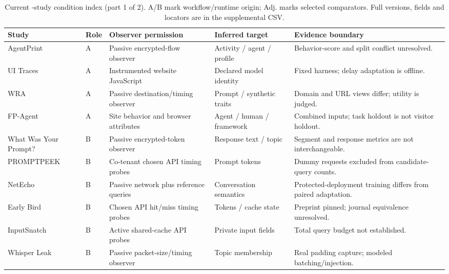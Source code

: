 \begin{table}[!t]
\centering\footnotesize
\setlength{\tabcolsep}{3pt}\renewcommand{\arraystretch}{1.08}
\caption{Current \FinalN{}-study condition index (part 1 of 2). A/B mark workflow/runtime origin; Adj. marks selected comparators. Full versions, fields and locators are in the supplemental CSV.}
\label{app:final-study-matrix}\label{tab:final-study-matrix-1}
\begin{tabularx}{\textwidth}{@{}>{\raggedright\arraybackslash}p{}>{\raggedright\arraybackslash}p{}>{\raggedright\arraybackslash}p{}>{\raggedright\arraybackslash}p{}Y@{}}
\toprule Study & Role & Observer permission & Inferred target & Evidence boundary \\
\midrule
AgentPrint \cite{agentprint2025} & A & Passive encrypted-flow observer & Activity / agent / profile & Behavior-score and split conflict unresolved. \\
UI Traces \cite{uitraces2026} & A & Instrumented website JavaScript & Declared model identity & Fixed harness; delay adaptation is offline. \\
WRA \cite{jeong2026wra} & A & Passive destination/timing observer & Prompt / synthetic traits & Domain and URL views differ; utility is judged. \\
FP-Agent \cite{wang2026fpagent} & A & Site behavior and browser attributes & Agent / human / framework & Combined inputs; task holdout is not visitor holdout. \\
What Was Your Prompt?\newline \cite{weiss2024prompt} & B & Passive encrypted-token observer & Response text / topic & Segment and response metrics are not interchangeable. \\
PROMPTPEEK \cite{promptpeek2025} & B & Co-tenant chosen API timing probes & Prompt tokens & Dummy requests excluded from candidate-query counts. \\
NetEcho \cite{netecho2025} & B & Passive network plus reference queries & Conversation semantics & Protected-deployment training differs from paired adaptation. \\
Early Bird \cite{earlybird2025} & B & Chosen API hit/miss timing probes & Tokens / cache state & Preprint pinned; journal equivalence unresolved. \\
InputSnatch \cite{inputsnatch2024} & B & Active shared-cache API probes & Private input fields & Total query budget not established. \\
Whisper Leak \cite{whisperleak2025} & B & Passive packet-size/timing observer & Topic membership & Real padding capture; modeled batching/injection. \\

\end{tabularx}
\end{table}
